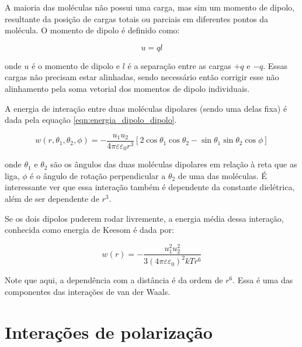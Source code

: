 	A maioria das moléculas não possui uma carga, mas sim um momento de dipolo, resultante da posição de cargas totais ou parciais em diferentes pontos da molécula. O momento de dipolo é definido como:
	
	\begin{equation}
		u = ql
		\label{eqn:momento_dipolo}
	\end{equation}
	
	\noindent onde \(u\) é o momento de dipolo e \(l\) é a separação entre as cargas \(+q\) e \(-q\). Essas cargas não precisam estar alinhadas, sendo necessário então corrigir esse não alinhamento pela soma vetorial dos momentos de dipolo individuais.
	
	A energia de interação entre duas moléculas dipolares (sendo uma delas fixa) é dada pela equação \ref{eqn:energia_dipolo_dipolo}.
	
	\begin{equation}
		w \left( r , \theta _ { 1 } , \theta _ { 2 } , \phi \right) = - \frac { u _ { 1 } u _ { 2 } } { 4 \pi \varepsilon \varepsilon _ { 0 } r ^ { 3 } } \left[ 2 \cos \theta _ { 1 } \cos \theta _ { 2 } - \sin \theta _ { 1 } \sin \theta _ { 2 } \cos \phi \right]
		\label{eqn:energia_dipolo_dipolo}
	\end{equation}
	
	\noindent onde \(\theta_{ 1 }\) e \(\theta_{ 2 }\) são os ângulos das duas moléculas dipolares em relação à reta que as liga, \(\phi\) é o ângulo de rotação perpendicular a \(\theta_{ 2 }\) de uma das moléculas. É interessante ver que essa interação também é dependente da constante dielétrica, além de ser dependente de \(r^3\).  %
	
	Se os dois dipolos puderem rodar livremente, a energia média dessa interação, conhecida como energia de Keesom é dada por:
	
	\begin{equation}
		w(r) = - \dfrac{u _ { 1 } ^ { 2 } u _ { 2 } ^ { 2 } }{ 3 \left( 4 \pi \varepsilon \varepsilon _ { 0 } \right) ^ { 2 } k T r ^ { 6 } }
		\label{eqn:energia_Keesom}
	\end{equation}
	
	Note que aqui, a dependência com a distância é da ordem de \(r^6\). Essa é uma das componentes das interações de van der Waals.
	
	\section{Interações de polarização}
	
